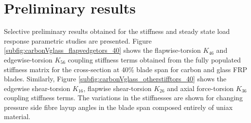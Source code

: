\documentclass[a4paper]{jpconf}
\begin{document}
\section{Preliminary results}
\label{sec:results}
Selective preliminary results obtained for the stiffness and steady state load response parametric studies are presented. Figure \ref{subfig:carbonVglass_flapvedgetors_40} shows the flapwise-torsion $K_{46}$ and edgewise-torsion $K_{56}$ coupling stiffness terms obtained from the fully populated stiffness matrix for the cross-section at 40\% blade span for carbon and glass FRP blades. Similarly, Figure \ref{subfig:carbonVglass_otherstifftors_40} shows the edgewise shear-torsion $K_{16}$, flapwise shear-torsion $K_{26}$ and axial force-torsion $K_{36}$ coupling stiffness terms. The variations in the stiffnesses are shown for changing pressure side fibre layup angles in the blade span composed entirely of uniax material.
\end{document}
